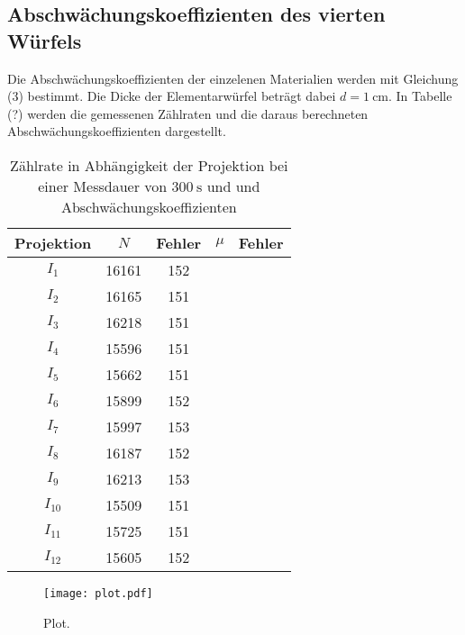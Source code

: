 \subsection{Abschwächungskoeffizienten des vierten Würfels}
Die Abschwächungskoeffizienten der einzelenen Materialien werden mit Gleichung (3) bestimmt. Die Dicke
der Elementarwürfel beträgt dabei $d=\SI{1}{\centi\meter}$. In Tabelle (?) werden die gemessenen Zählraten und
die daraus berechneten Abschwächungskoeffizienten dargestellt.

\begin{table}[H]
  \centering
  \caption{Zählrate in Abhängigkeit der Projektion bei einer Messdauer von $\SI{300}{\second}$ und und Abschwächungskoeffizienten }
  \label{tab:Parameter}
  \begin{tabular}{c c c | c c}
    \toprule
    Projektion & $N$ & Fehler & $\mu$ & Fehler   \\
    \midrule
        $I_1$    & 16161 & 152 & &    \\
        $I_2$    & 16165 & 151 & &    \\
        $I_3$    & 16218 & 151 & &    \\
        $I_4$    & 15596 & 151 & &    \\
        $I_5$    & 15662 & 151 & &    \\
        $I_6$    & 15899 & 152 & &    \\
        $I_7$    & 15997 & 153 & &    \\
        $I_8$    & 16187 & 152 & &    \\
        $I_9$    & 16213 & 153 & &    \\
        $I_{10}$ & 15509 & 151 & &   \\
        $I_{11}$ & 15725 & 151 & &    \\
        $I_{12}$ & 15605 & 152 & &    \\
    \bottomrule
  \end{tabular}
\end{table}


\begin{figure}
  \centering
  \texttt{[image: plot.pdf]}
  \caption{Plot.}
  \label{fig:plot}
\end{figure}
